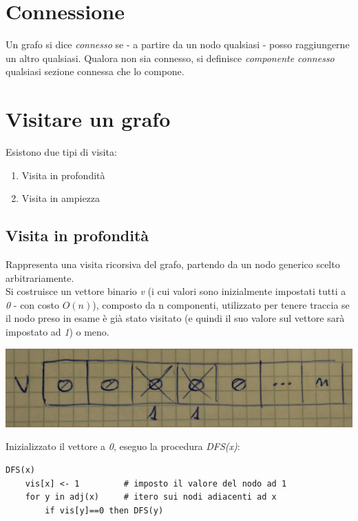 \section{Connessione}
Un grafo si dice \textit{connesso} se - a partire da un nodo qualsiasi - posso raggiungerne un altro qualsiasi.
Qualora non sia connesso, si definisce \textit{componente connesso} qualsiasi sezione connessa che lo compone.

\section{Visitare un grafo}
Esistono due tipi di visita:
\begin{enumerate}
    \item Visita in profondità
    \item Visita in ampiezza
\end{enumerate}

\subsection{Visita in profondità}
Rappresenta una visita ricorsiva del grafo, partendo da un nodo generico scelto arbitrariamente. \\
Si costruisce un vettore binario \textit{v} (i cui valori sono inizialmente impostati tutti a \textit{0} - con costo $O(n)$), composto da n componenti, utilizzato per tenere traccia se il nodo preso in esame è già stato visitato (e quindi il suo valore sul vettore sarà impostato ad \textit{1}) o meno.\\
\begin{center}
    \includegraphics[width=.8\textwidth]{vettore-visita.jpg} \hfill
\end{center}
\newpage

Inizializzato il vettore a \textit{0}, eseguo la procedura \textit{DFS(x)}:
\begin{lstlisting}
DFS(x)
    vis[x] <- 1         # imposto il valore del nodo ad 1
    for y in adj(x)     # itero sui nodi adiacenti ad x
        if vis[y]==0 then DFS(y)
\end{lstlisting}

